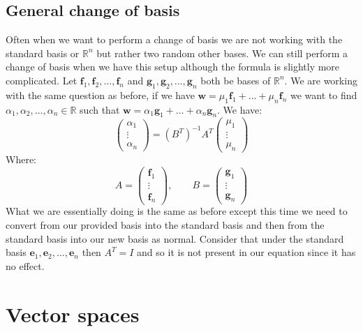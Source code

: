 \documentclass[12pt]{article}
\newcommand{\arbvec}[2]{\ensuremath{\textbf{#1}_1,\textbf{#1}_2,\dots,\textbf{#1}_{#2}}}
\newcommand{\arbreal}[2]{{#1}_1,{#1}_2,\dots,{#1}_{#2}}
\begin{document}
\subsection*{General change of basis}
Often when we want to perform a change of basis we are not working with the standard basis or \(\mathbb{R}^n\) but rather two random other bases. We can still perform a change of basis when we have this setup although the formula is slightly more complicated. Let \(\arbvec{f}{n}\) and \(\arbvec{g}{n}\) both be bases of \(\mathbb{R}^n\). We are working with the same question as before, if we have \(\textbf{w}=\mu_1\textbf{f}_1+\dots+\mu_n\textbf{f}_n\) we want to find \(\arbreal{\alpha}{n}\in\mathbb{R}\) such that \(\textbf{w}=\alpha_1\textbf{g}_1+\dots+\alpha_n\textbf{g}_n\). We have:
\[\begin{pmatrix}
    \alpha_1 \\
    \vdots \\
    \alpha_n
\end{pmatrix}=(B^T)^{-1}A^T\begin{pmatrix}
    \mu_1 \\
    \vdots \\
    \mu_n
\end{pmatrix}\]
Where:
\[A=\begin{pmatrix}
    \textbf{f}_1 \\
    \vdots \\
    \textbf{f}_n
\end{pmatrix},\qquad B=\begin{pmatrix}
    \textbf{g}_1 \\
    \vdots \\
    \textbf{g}_n
\end{pmatrix}\]
What we are essentially doing is the same as before except this time we need to convert from our provided basis into the standard basis and then from the standard basis into our new basis as normal. Consider that under the standard basis \(\arbvec{e}{n}\) then \(A^T=I\) and so it is not present in our equation since it has no effect.
\section{Vector spaces}
\end{document}
